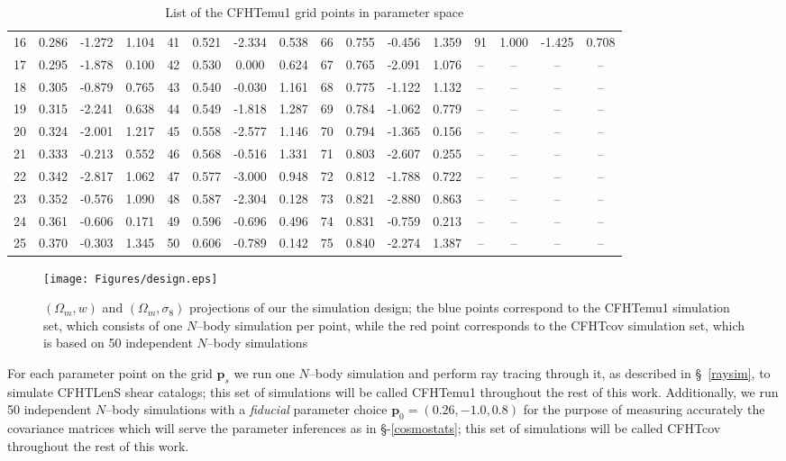 \documentclass[reprint,aps,prd,superscriptaddress,showkeys,showpacs]{revtex4-1}
\begin{document}
\begin{table*}
\begin{tabular}{c|ccc||c|ccc||c|ccc||c|ccc}
16 & 0.286 & -1.272 & 1.104 & 41 & 0.521 & -2.334 & 0.538 & 66 & 0.755 & -0.456 & 1.359 & 91 & 1.000 & -1.425 & 0.708 \\
17 & 0.295 & -1.878 & 0.100 & 42 & 0.530 & 0.000 & 0.624 & 67 & 0.765 & -2.091 & 1.076 & -- & -- & -- & -- \\
18 & 0.305 & -0.879 & 0.765 & 43 & 0.540 & -0.030 & 1.161 & 68 & 0.775 & -1.122 & 1.132 & -- & -- & -- & -- \\
19 & 0.315 & -2.241 & 0.638 & 44 & 0.549 & -1.818 & 1.287 & 69 & 0.784 & -1.062 & 0.779 & -- & -- & -- & -- \\
20 & 0.324 & -2.001 & 1.217 & 45 & 0.558 & -2.577 & 1.146 & 70 & 0.794 & -1.365 & 0.156 & -- & -- & -- & -- \\
21 & 0.333 & -0.213 & 0.552 & 46 & 0.568 & -0.516 & 1.331 & 71 & 0.803 & -2.607 & 0.255 & -- & -- & -- & -- \\
22 & 0.342 & -2.817 & 1.062 & 47 & 0.577 & -3.000 & 0.948 & 72 & 0.812 & -1.788 & 0.722 & -- & -- & -- & -- \\
23 & 0.352 & -0.576 & 1.090 & 48 & 0.587 & -2.304 & 0.128 & 73 & 0.821 & -2.880 & 0.863 & -- & -- & -- & -- \\
24 & 0.361 & -0.606 & 0.171 & 49 & 0.596 & -0.696 & 0.496 & 74 & 0.831 & -0.759 & 0.213 & -- & -- & -- & -- \\
25 & 0.370 & -0.303 & 1.345 & 50 & 0.606 & -0.789 & 0.142 & 75 & 0.840 & -2.274 & 1.387 & -- & -- & -- & -- \\
\end{tabular}
\caption{List of the CFHTemu1 grid points in parameter space}
\label{designtable}
\end{table*}
%
\begin{figure*}
\begin{center}
\texttt{[image: Figures/design.eps]}
\caption{$(\Omega_m,w)$ and $(\Omega_m,\sigma_8)$ projections of our the simulation design; the blue points correspond to the CFHTemu1 simulation set, which consists of one $N$--body simulation per point, while the red point corresponds to the CFHTcov simulation set, which is based on 50 independent $N$--body simulations}
\label{designfig}
\end{center}
\end{figure*}
%
For each parameter point on the grid $\mathbf{p}_s$ we run one $N$--body simulation and perform ray tracing through it, as described in \S~\ref{raysim}, to simulate CFHTLenS shear catalogs; this set of simulations will be called CFHTemu1 throughout the rest of this work. Additionally, we run 50 independent $N$--body simulations with a \textit{fiducial} parameter choice $\mathbf{p}_0=(0.26,-1.0,0.8)$ for the purpose of measuring accurately the covariance matrices which will serve the parameter inferences as in \S-\ref{cosmostats}; this set of simulations will be called CFHTcov throughout the rest of this work.    
\end{document}
